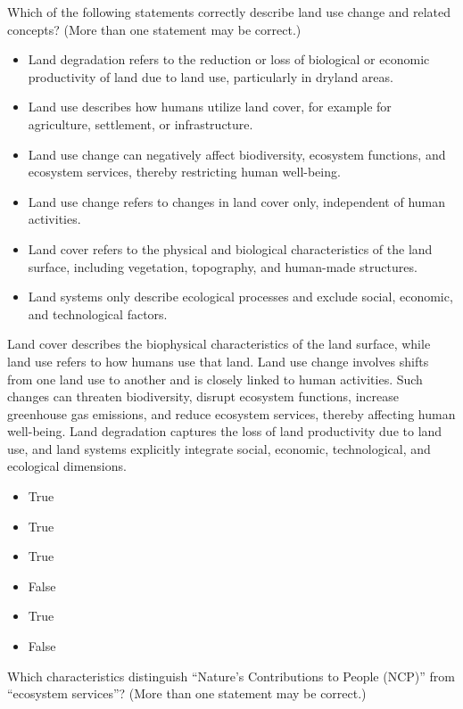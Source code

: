 \documentclass[
  a4paper,
  DIV=11,
  numbers=noendperiod,
  oneside,
  openany]{scrreprt}
\providecommand{\tightlist}{%
  \setlength{\itemsep}{0pt}\setlength{\parskip}{0pt}}
\begin{document}
Which of the following statements correctly describe land use change and
related concepts? (More than one statement may be correct.)

\begin{itemize}
\tightlist
\item[$\square$]
  Land degradation refers to the reduction or loss of biological or
  economic productivity of land due to land use, particularly in dryland
  areas.
\item[$\square$]
  Land use describes how humans utilize land cover, for example for
  agriculture, settlement, or infrastructure.
\item[$\square$]
  Land use change can negatively affect biodiversity, ecosystem
  functions, and ecosystem services, thereby restricting human
  well-being.
\item[$\square$]
  Land use change refers to changes in land cover only, independent of
  human activities.
\item[$\square$]
  Land cover refers to the physical and biological characteristics of
  the land surface, including vegetation, topography, and human-made
  structures.
\item[$\square$]
  Land systems only describe ecological processes and exclude social,
  economic, and technological factors.
\end{itemize}

Land cover describes the biophysical characteristics of the land
surface, while land use refers to how humans use that land. Land use
change involves shifts from one land use to another and is closely
linked to human activities. Such changes can threaten biodiversity,
disrupt ecosystem functions, increase greenhouse gas emissions, and
reduce ecosystem services, thereby affecting human well-being. Land
degradation captures the loss of land productivity due to land use, and
land systems explicitly integrate social, economic, technological, and
ecological dimensions.

\begin{itemize}
\tightlist
\item
  True
\item
  True
\item
  True
\item
  False
\item
  True
\item
  False
\end{itemize}

Which characteristics distinguish ``Nature's Contributions to People
(NCP)'' from ``ecosystem services''? (More than one statement may be
correct.)
\end{document}
